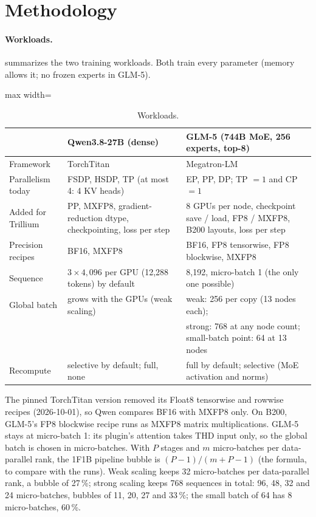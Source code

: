 \section{Methodology}
\label{sec:method}

\paragraph{Workloads.}  summarizes the two training workloads. Both train every
parameter (memory allows it; no frozen experts in GLM-5).

\begin{table}[h]
  \caption{Workloads.}
  \label{tab:workloads}
  \centering\small
  \begin{adjustbox}{max width=\linewidth}
  \begin{tabular}{lll}
    \toprule
    & Qwen3.8-27B (dense) & GLM-5 (744B MoE, 256 experts, top-8) \\
    \midrule
    Framework & TorchTitan & Megatron-LM \\
    Parallelism today & FSDP, HSDP, TP (at most 4: 4 KV heads) & EP, PP, DP; TP $=1$ and CP $=1$ \\
    Added for Trillium & PP, MXFP8, gradient-reduction dtype, checkpointing, loss per step
           & 8 GPUs per node, checkpoint save / load, FP8 / MXFP8, B200 layouts, loss per step \\
    Precision recipes & BF16, MXFP8 & BF16, FP8 tensorwise, FP8 blockwise, MXFP8 \\
    Sequence & $3\times4{,}096$ per GPU (12{,}288 tokens) by default & 8{,}192, micro-batch 1 (the only one possible) \\
    Global batch & grows with the GPUs (weak scaling) & weak: 256 per copy (13 nodes each); \\
                 & & strong: 768 at any node count; small-batch point: 64 at 13 nodes \\
    Recompute & selective by default; full, none & full by default; selective (MoE activation and norms) \\
    \bottomrule
  \end{tabular}
  \end{adjustbox}
\end{table}

The pinned TorchTitan version removed its Float8 tensorwise and rowwise recipes (2026-10-01), so Qwen
compares BF16 with MXFP8 only. On B200, GLM-5's FP8 blockwise recipe runs as MXFP8 matrix multiplications.
GLM-5 stays at micro-batch 1: its plugin's attention takes THD input only, so the global batch is chosen in micro-batches.
With $P$ stages and $m$ micro-batches per data-parallel rank, the 1F1B pipeline bubble is $(P-1)/(m+P-1)$ \est{} (the
formula, to compare with the runs). Weak scaling keeps 32 micro-batches per data-parallel rank, a bubble of 27\,\%; strong scaling
keeps 768 sequences in total: 96, 48, 32 and 24 micro-batches, bubbles of 11, 20, 27 and 33\,\%; the small batch of 64 has 8 micro-batches, 60\,\%.

